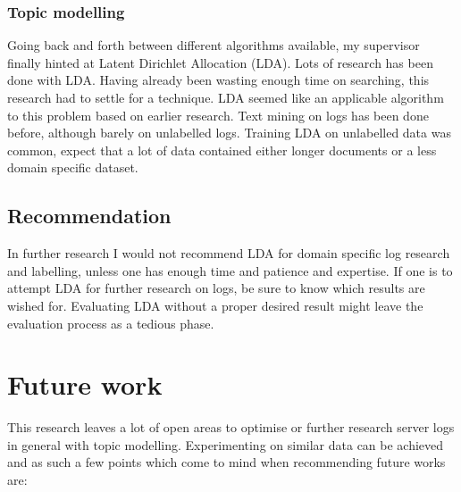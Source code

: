 \subsubsection{Topic modelling}
Going back and forth between different algorithms available, my supervisor finally hinted at Latent Dirichlet Allocation (LDA). Lots of research has been done with LDA. Having already been wasting enough time on searching, this research had to settle for a technique. LDA seemed like an applicable algorithm to this problem based on earlier research. Text mining on logs has been done before, although barely on unlabelled logs. Training LDA on unlabelled data was common, expect that a lot of data contained either longer documents or a less domain specific dataset. 

\subsection{Recommendation}
In further research I would not recommend LDA for domain specific log research and labelling, unless one has enough time and patience and expertise. If one is to attempt LDA for further research on logs, be sure to know which results are wished for. Evaluating LDA without a proper desired result might leave the evaluation process as a tedious phase. 

\section{Future work}
This research leaves a lot of open areas to optimise or further research server logs in general with topic modelling. Experimenting on similar data can be achieved and as such a few points which come to mind when recommending future works are:

